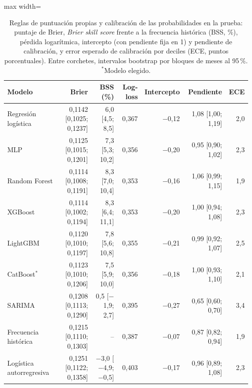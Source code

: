 \begin{table}[htbp]\centering\small
\caption{Reglas de puntuación propias y calibración de las probabilidades en la prueba: puntaje de Brier, \emph{Brier skill score} frente a la frecuencia histórica (BSS, \%), pérdida logarítmica, intercepto (con pendiente fija en 1) y pendiente de calibración, y error esperado de calibración por deciles (ECE, puntos porcentuales). Entre corchetes, intervalos bootstrap por bloques de meses al 95\,\%. $^\ast$Modelo elegido.}\label{tab:clf_extra}
\begin{adjustbox}{max width=\textwidth}\begin{tabular}{lrrrrrr}\toprule
Modelo & Brier & BSS (\%) & Log-loss & Intercepto & Pendiente & ECE\\ \midrule
Regresión logística & 0{,}1142 [0{,}1025; 0{,}1237] & 6{,}0 [4{,}5; 8{,}5] & 0{,}367 & \ensuremath{-}0{,}12 & 1{,}08 [1{,}00; 1{,}19] & 2{,}0 \\
MLP & 0{,}1125 [0{,}1015; 0{,}1201] & 7{,}3 [5{,}3; 10{,}2] & 0{,}356 & \ensuremath{-}0{,}20 & 0{,}95 [0{,}90; 1{,}02] & 2{,}3 \\
Random Forest & 0{,}1114 [0{,}1008; 0{,}1191] & 8{,}3 [7{,}0; 10{,}4] & 0{,}353 & \ensuremath{-}0{,}16 & 1{,}06 [0{,}99; 1{,}15] & 1{,}9 \\
XGBoost & 0{,}1114 [0{,}1002; 0{,}1194] & 8{,}3 [6{,}4; 11{,}1] & 0{,}353 & \ensuremath{-}0{,}20 & 1{,}00 [0{,}94; 1{,}08] & 2{,}3 \\
LightGBM & 0{,}1120 [0{,}1010; 0{,}1197] & 7{,}8 [5{,}6; 10{,}8] & 0{,}355 & \ensuremath{-}0{,}21 & 0{,}99 [0{,}92; 1{,}07] & 2{,}5 \\
CatBoost$^\ast$ & 0{,}1123 [0{,}1010; 0{,}1206] & 7{,}5 [5{,}9; 10{,}0] & 0{,}356 & \ensuremath{-}0{,}18 & 1{,}00 [0{,}93; 1{,}10] & 2{,}1 \\
\midrule
SARIMA & 0{,}1208 [0{,}1113; 0{,}1290] & 0{,}5 [\ensuremath{-}1{,}9; 2{,}7] & 0{,}395 & \ensuremath{-}0{,}27 & 0{,}65 [0{,}60; 0{,}70] & 3{,}4 \\
Frecuencia histórica & 0{,}1215 [0{,}1110; 0{,}1303] & -- & 0{,}387 & \ensuremath{-}0{,}07 & 0{,}87 [0{,}82; 0{,}94] & 1{,}9 \\
Logística autorregresiva & 0{,}1251 [0{,}1122; 0{,}1358] & \ensuremath{-}3{,}0 [\ensuremath{-}4{,}9; \ensuremath{-}0{,}5] & 0{,}403 & \ensuremath{-}0{,}17 & 0{,}96 [0{,}89; 1{,}08] & 2{,}3 \\
\bottomrule\end{tabular}\end{adjustbox}\end{table}
